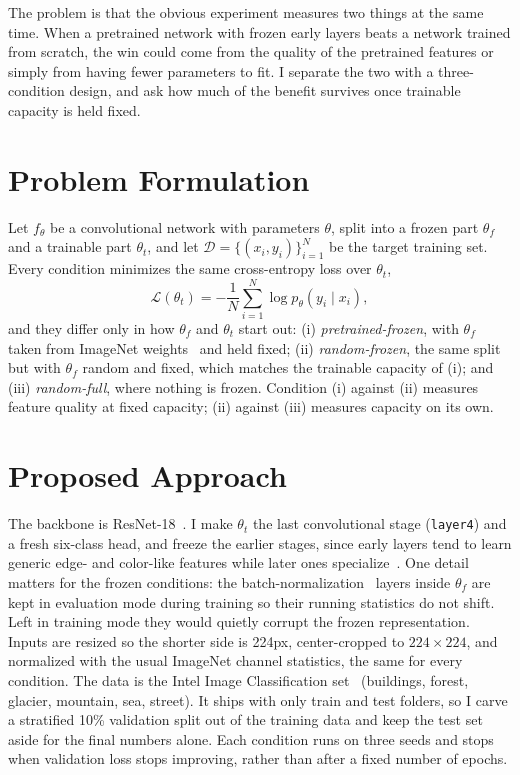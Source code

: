 \documentclass[conference]{IEEEtran}
\begin{document}
The problem is that the obvious experiment measures two things at the same time. When a pretrained network with frozen early layers beats a network trained from scratch, the win could come from the quality of the pretrained features or simply from having fewer parameters to fit. I separate the two with a three-condition design, and ask how much of the benefit survives once trainable capacity is held fixed.

\section{Problem Formulation}
Let $f_\theta$ be a convolutional network with parameters $\theta$, split into a frozen part $\theta_f$ and a trainable part $\theta_t$, and let $\mathcal{D}=\{(x_i,y_i)\}_{i=1}^N$ be the target training set. Every condition minimizes the same cross-entropy loss over $\theta_t$,
\begin{equation}
\mathcal{L}(\theta_t) = -\frac{1}{N}\sum_{i=1}^{N}\log p_\theta(y_i \mid x_i),
\end{equation}
and they differ only in how $\theta_f$ and $\theta_t$ start out: (i) \textit{pretrained-frozen}, with $\theta_f$ taken from ImageNet weights~\cite{he2016deep,deng2009imagenet} and held fixed; (ii) \textit{random-frozen}, the same split but with $\theta_f$ random and fixed, which matches the trainable capacity of (i); and (iii) \textit{random-full}, where nothing is frozen. Condition (i) against (ii) measures feature quality at fixed capacity; (ii) against (iii) measures capacity on its own.

\section{Proposed Approach}
The backbone is ResNet-18~\cite{he2016deep}. I make $\theta_t$ the last convolutional stage (\texttt{layer4}) and a fresh six-class head, and freeze the earlier stages, since early layers tend to learn generic edge- and color-like features while later ones specialize~\cite{yosinski2014transferable}. One detail matters for the frozen conditions: the batch-normalization~\cite{ioffe2015batch} layers inside $\theta_f$ are kept in evaluation mode during training so their running statistics do not shift. Left in training mode they would quietly corrupt the frozen representation. Inputs are resized so the shorter side is 224px, center-cropped to $224\times224$, and normalized with the usual ImageNet channel statistics, the same for every condition. The data is the Intel Image Classification set~\cite{intelclassification} (buildings, forest, glacier, mountain, sea, street). It ships with only train and test folders, so I carve a stratified 10\% validation split out of the training data and keep the test set aside for the final numbers alone. Each condition runs on three seeds and stops when validation loss stops improving, rather than after a fixed number of epochs.
\end{document}
